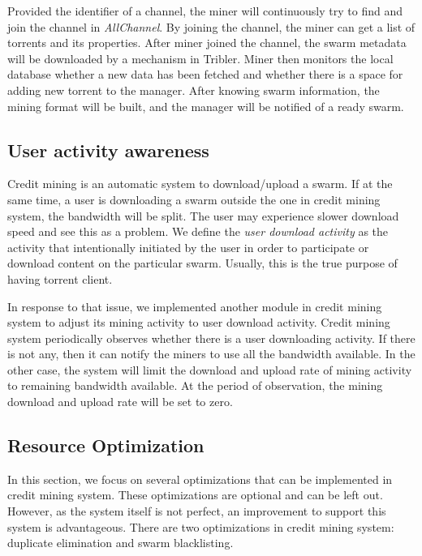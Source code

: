 Provided the identifier of a channel, the miner will continuously try to find and join the channel in \textit{AllChannel}. By joining the channel, the miner can get a list of torrents and its properties. After miner joined the channel, the swarm metadata will be downloaded by a mechanism in Tribler. Miner then monitors the local database whether a new data has been fetched and whether there is a space for adding new torrent to the manager. After knowing swarm information, the mining format will be built, and the manager will be notified of a ready swarm.

\subsection{User activity awareness}
\label{section:uactivityimpl}
Credit mining is an automatic system to download/upload a swarm. If at the same time, a user is downloading a swarm outside the one in credit mining system, the bandwidth will be split. The user may experience slower download speed and see this as a problem. We define the \textit{user download activity} as the activity that intentionally initiated by the user in order to participate or download content on the particular swarm. Usually, this is the true purpose of having torrent client. 

In response to that issue, we implemented another module in credit mining system to adjust its mining activity to user download activity. Credit mining system periodically observes whether there is a user downloading activity. If there is not any, then it can notify the miners to use all the bandwidth available. In the other case, the system will limit the download and upload rate of mining activity to remaining bandwidth available. At the period of observation, the mining download and upload rate will be set to zero.


\subsection{Resource Optimization}
\label{section:optimization}
In this section, we focus on several optimizations that can be implemented in credit mining system. These optimizations are optional and can be left out. However, as the system itself is not perfect, an improvement to support this system is advantageous. There are two optimizations in credit mining system: duplicate elimination and swarm blacklisting.%

